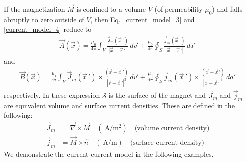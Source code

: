 \documentclass[11pt,a4paper,oneside]{book}
\numberwithin{equation}{section}
\newcommand{\abs}[1]{\left|#1\right|}
\theoremstyle{it}
\theoremstyle{definition}
\begin{document}
If the magnetization $\vec{M}$ is confined to a volume $V$ (of permeability $\mu_0$) and falls abruptly to zero outside of $V$, then Eq.~\eqref{current_model_3} and \ref{current_model_4} reduce to
 \begin{equation}\label{current_model_5}
\boxed{	\begin{aligned}
		\vec{A}(\vec{x})=\frac{\mu_0}{4\pi}\int_{V}\frac{\vec{J}_m(\vec{x}\,')}{\abs{\vec{x}-\vec{x}\,'}}\,dv' +
		\frac{\mu_0}{4\pi}\oint_{S}\frac{\vec{j}_m(\vec{x}\,')}{\abs{\vec{x}-\vec{x}\,'}}\,da'
	\end{aligned}}
\end{equation}
and
 \begin{equation}\label{current_model_6}
\boxed{	\begin{aligned}
		\vec{B}(\vec{x})=\frac{\mu_0}{4\pi}\int_{V}\vec{J}_m(\vec{x}\,')\times\frac{(\vec{x}-\vec{x}\,')}{\abs{\vec{x}-\vec{x}\,'}^3}\,dv' + 
		\frac{\mu_0}{4\pi}\oint_{S}\vec{j}_m(\vec{x}\,')\times\frac{(\vec{x}-\vec{x}\,')}{\abs{\vec{x}-\vec{x}\,'}^3}\,da'
	\end{aligned}}
\end{equation}
respectively. In these expression $\mathcal{S}$ is the surface of the magnet and $\vec{J}_m$ and $\vec{j}_m$ are equivalent volume and surface current densities. These are defined in the following:
\begin{equation}\label{current_model_7}
\boxed{	\begin{aligned}
		\vec{J}_m &= \vec{\nabla}\times\vec{M}\quad(\SI{}{\ampere\per\square\meter})\quad\text{(volume current density)} \\[6pt]
		\vec{j}_m &= \vec{M}\times\hat{n}\quad(\SI{}{\ampere\per\meter})\quad\text{(surface current density)}
\end{aligned}}
\end{equation}
We demonstrate the current current model in the following examples.
\end{document}
